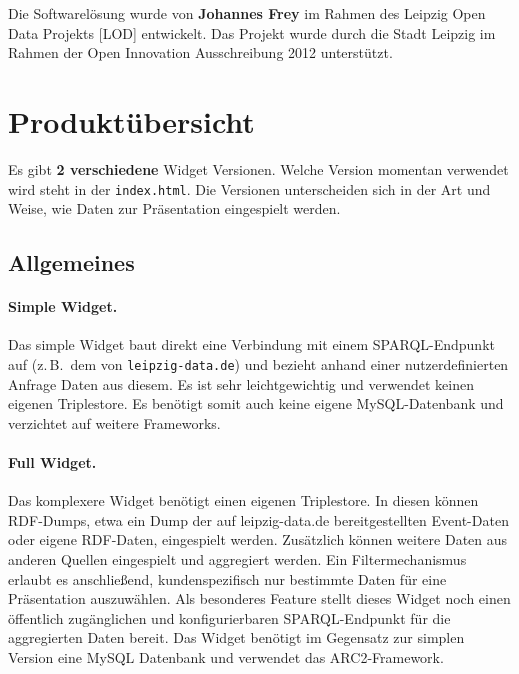 \documentclass[11pt,a4paper]{article}
\begin{document}
Die Softwarelösung wurde von \textbf{Johannes Frey} im Rahmen des Leipzig Open
Data Projekts [LOD] entwickelt. Das Projekt wurde durch die Stadt Leipzig im
Rahmen der Open Innovation Ausschreibung 2012 unterstützt.

\section{Produktübersicht}

Es gibt \textbf{2 verschiedene} Widget Versionen. Welche Version momentan
verwendet wird steht in der \texttt{index.html}.  Die Versionen unterscheiden
sich in der Art und Weise, wie Daten zur Präsentation eingespielt werden.

\subsection{Allgemeines}

\paragraph{Simple Widget.}
Das simple Widget baut direkt eine Verbindung mit einem SPARQL-Endpunkt auf
(z.\,B.\ dem von \texttt{leipzig-data.de}) und bezieht anhand einer
nutzerdefinierten Anfrage Daten aus diesem. Es ist sehr leichtgewichtig und
verwendet keinen eigenen Triplestore. Es benötigt somit auch keine eigene
MySQL-Datenbank und verzichtet auf weitere Frameworks.

\paragraph{Full Widget.}
Das komplexere Widget benötigt einen eigenen Triplestore. In diesen können
RDF-Dumps, etwa ein Dump der auf leipzig-data.de bereitgestellten Event-Daten
oder eigene RDF-Daten, eingespielt werden. Zusätzlich können weitere Daten aus
anderen Quellen eingespielt und aggregiert werden.  Ein Filtermechanismus
erlaubt es anschließend, kundenspezifisch nur bestimmte Daten für eine
Präsentation auszuwählen. Als besonderes Feature stellt dieses Widget noch
einen öffentlich zugänglichen und konfigurierbaren SPARQL-Endpunkt für die
aggregierten Daten bereit. Das Widget benötigt im Gegensatz zur simplen
Version eine MySQL Datenbank und verwendet das ARC2-Framework.
\end{document}

